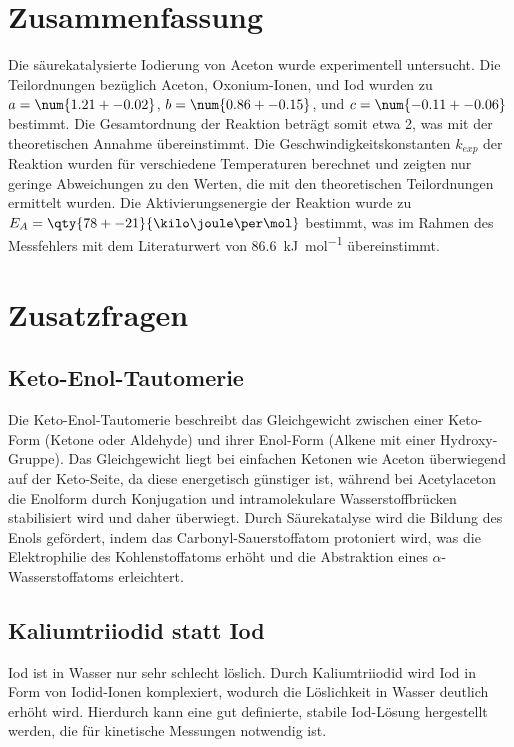 \section{Zusammenfassung}
Die säurekatalysierte Iodierung von Aceton wurde experimentell untersucht.
Die Teilordnungen bezüglich Aceton, Oxonium-Ionen, und Iod wurden zu $a = \num{1.21 +- 0.02}$, $b = \num{0.86 +- 0.15}$, und $c = \num{-0.11 +- 0.06}$ bestimmt.
Die Gesamtordnung der Reaktion beträgt somit etwa 2, was mit der theoretischen Annahme übereinstimmt.
Die Geschwindigkeitskonstanten $k_{exp}$ der Reaktion wurden für verschiedene Temperaturen berechnet und zeigten nur geringe Abweichungen zu den Werten, die mit den theoretischen Teilordnungen ermittelt wurden.
Die Aktivierungsenergie der Reaktion wurde zu $E_A = \qty{78 +- 21}{\kilo\joule\per\mol}$ bestimmt, was im Rahmen des Messfehlers mit dem Literaturwert von \qty{86.6}{\kilo\joule\per\mol}\autocite{smith1934381} übereinstimmt.

\section{Zusatzfragen}
\subsection{Keto-Enol-Tautomerie}
Die Keto-Enol-Tautomerie beschreibt das Gleichgewicht zwischen einer Keto-Form (Ketone oder Aldehyde) und ihrer Enol-Form (Alkene mit einer Hydroxy-Gruppe).
Das Gleichgewicht liegt bei einfachen Ketonen wie Aceton überwiegend auf der Keto-Seite, da diese energetisch günstiger ist, während bei Acetylaceton die Enolform durch Konjugation und intramolekulare Wasserstoffbrücken stabilisiert wird und daher überwiegt.
Durch Säurekatalyse wird die Bildung des Enols gefördert, indem das Carbonyl-Sauerstoffatom protoniert wird, was die Elektrophilie des Kohlenstoffatoms erhöht und die Abstraktion eines $\alpha$-Wasserstoffatoms erleichtert.

\subsection{Kaliumtriiodid statt Iod}
Iod ist in Wasser nur sehr schlecht löslich.
Durch Kaliumtriiodid wird Iod in Form von Iodid-Ionen komplexiert, wodurch die Löslichkeit in Wasser deutlich erhöht wird.
Hierdurch kann eine gut definierte, stabile Iod-Lösung hergestellt werden, die für kinetische Messungen notwendig ist.

